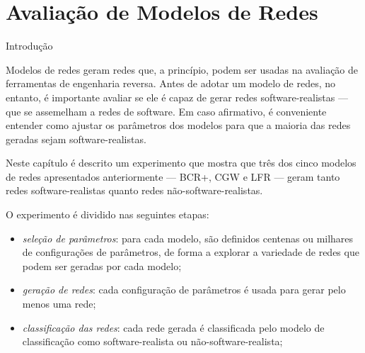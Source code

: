 \chapter{Avaliação de Modelos de Redes} \label{cap:avaliacao}

%


\begin{section}{Introdução}

	Modelos de redes geram redes que, a princípio, podem ser usadas na avaliação de ferramentas de engenharia reversa. Antes de adotar um modelo de redes, no entanto, é importante avaliar se ele é capaz de gerar redes software-realistas --- que se assemelham a redes de software. Em caso afirmativo, é conveniente entender como ajustar os parâmetros dos modelos para que a maioria das redes geradas sejam software-realistas.

	Neste capítulo é descrito um experimento que mostra que três dos cinco modelos de redes apresentados anteriormente --- BCR+, CGW e LFR --- geram tanto redes software-realistas quanto redes não-software-realistas. %
	
	O experimento é dividido nas seguintes etapas:
	
	\begin{itemize}
		\item \emph{seleção de parâmetros}: para cada modelo, são definidos centenas ou milhares de configurações de parâmetros, de forma a explorar a variedade de redes que podem ser geradas por cada modelo;
		\item \emph{geração de redes}: cada configuração de parâmetros é usada para gerar pelo menos uma rede;
		\item \emph{classificação das redes}: cada rede gerada é classificada pelo modelo de classificação como software-realista ou não-software-realista;
	\end{itemize}

\end{section}

